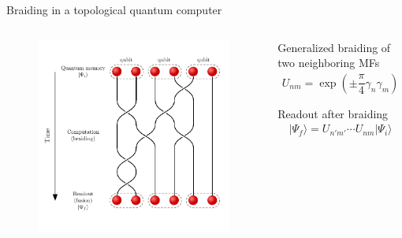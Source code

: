 \documentclass[xcolor=dvipsnames,10pt,aspectratio=169]{beamer}
\begin{document}
  \begin{frame}{Braiding in a topological quantum computer}
    \vspace{-10mm}
    \begin{columns}
      \begin{figure}
        \includegraphics[height=1.0\textheight]{./figures/braid-network.pdf}
      \end{figure}
      \small
      Generalized braiding of two neighboring MFs
      \begin{align*}
        U_{nm} = \exp\left(\pm\dfrac{\pi}{4} \gamma_n\gamma_m \right) \\ \\
      \end{align*}
      Readout after braiding
      \begin{align*}
        |\Psi_f\rangle = U_{n'm'} \cdots U_{nm} |\Psi_i\rangle
      \end{align*}
    \end{columns}

  \end{frame}
\end{document}
